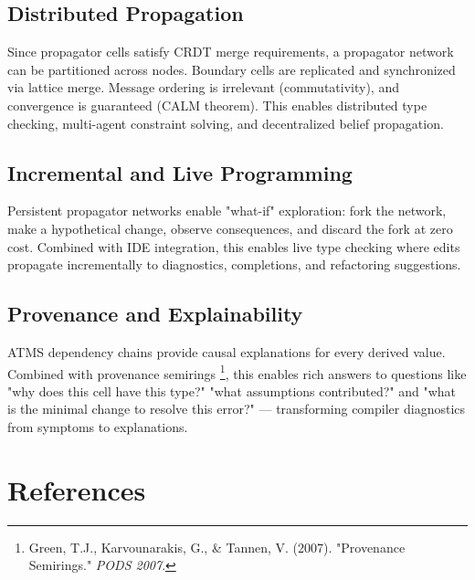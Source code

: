 \documentclass[11pt]{article}
\begin{document}
\subsection{Distributed Propagation}
\label{sec:org0557a49}

Since propagator cells satisfy CRDT merge requirements, a propagator
network can be partitioned across nodes. Boundary cells are replicated
and synchronized via lattice merge. Message ordering is irrelevant
(commutativity), and convergence is guaranteed (CALM theorem). This
enables distributed type checking, multi-agent constraint solving, and
decentralized belief propagation.
\subsection{Incremental and Live Programming}
\label{sec:orgbb8c7c4}

Persistent propagator networks enable "what-if" exploration: fork the
network, make a hypothetical change, observe consequences, and discard
the fork at zero cost. Combined with IDE integration, this enables live
type checking where edits propagate incrementally to diagnostics,
completions, and refactoring suggestions.
\subsection{Provenance and Explainability}
\label{sec:org8e2e4d0}

ATMS dependency chains provide causal explanations for every derived
value. Combined with provenance semirings \footnote{Green, T.J., Karvounarakis, G., \& Tannen, V.
(2007). "Provenance Semirings." \emph{PODS 2007}.},
this enables rich answers to questions like "why does this cell have
this type?" "what assumptions contributed?" and "what is the minimal
change to resolve this error?" --- transforming compiler diagnostics
from symptoms to explanations.
\section{References}
\label{sec:org91a08b8}
\end{document}
